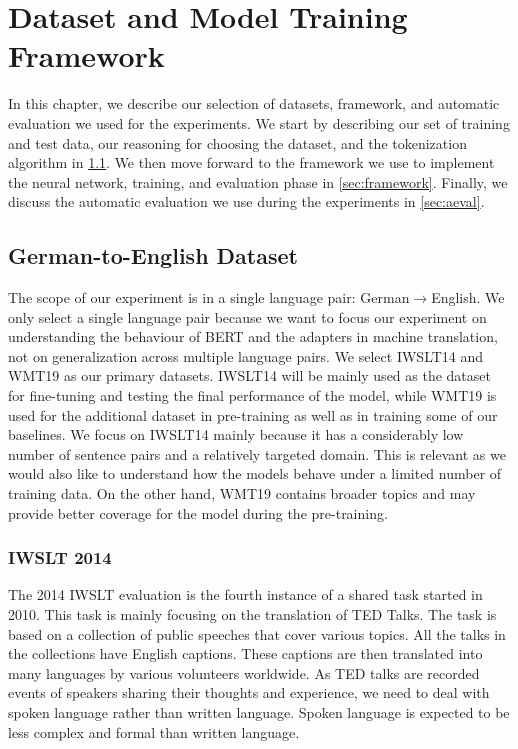 
\chapter{Dataset and Model Training Framework}
\label{chap:03}
In this chapter, we describe our selection of datasets, framework, and automatic evaluation we used for the experiments. We start by describing our set of training and test data, our reasoning for choosing the dataset, and the tokenization algorithm in \cref{sec:dataset}. We then move forward to the framework we use to implement the neural network, training, and evaluation phase in \cref{sec:framework}. Finally, we discuss the automatic evaluation we use during the experiments in  \cref{sec:aeval}.

\section{German-to-English Dataset}
\label{sec:dataset}
The scope of our experiment is in a single language pair: German$\rightarrow$English. We only select a single language pair because we want to focus our experiment on understanding the behaviour of BERT and the adapters in machine translation, not on generalization across multiple language pairs. We select IWSLT14 and WMT19 as our primary datasets. IWSLT14 will be mainly used as the dataset for fine-tuning and testing the final performance of the model, while WMT19 is used for the additional dataset in pre-training as well as in training some of our baselines.
We focus on  IWSLT14 mainly because it has a considerably low number of sentence pairs and a relatively targeted domain. This is relevant as we would also like to understand how the models behave under a limited number of training data. On the other hand, WMT19 contains broader topics and may provide better coverage for the model during the pre-training.

\subsection{IWSLT 2014}
The 2014 IWSLT evaluation  is the fourth instance of a shared task started in 2010. This task is mainly focusing on the translation of TED Talks. The task is based on a collection of public speeches that cover various topics. All the talks in the collections have English captions. These captions are then translated into many languages by various volunteers worldwide. As TED talks are recorded events of speakers sharing their thoughts and experience, we need to deal with spoken language rather than written language. Spoken language is expected to be less complex and formal than written language.

